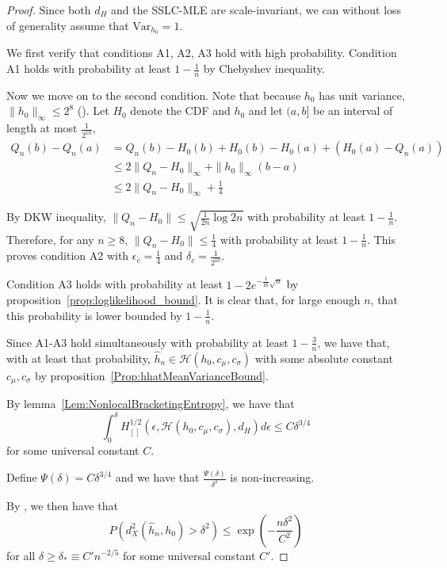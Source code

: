 \documentclass[12pt]{article}
\begin{document}
\begin{proof}

Since both $d_H$ and the SSLC-MLE are scale-invariant, we can without loss of generality assume that $\textrm{Var}_{h_0} = 1$.
  
We first verify that conditions A1, A2, A3 hold with high probability.
Condition A1 holds with probability at least $1 - \frac{1}{n}$ by Chebyshev inequality.

Now we move on to the second condition. Note that because $h_0$ has unit variance, $\| h_0 \|_\infty \leq 2^8$ (\cite[][Theorem~5.14]{lovasz2007geometry}). Let $H_0$ denote the CDF and $h_0$ and let $(a, b]$ be an interval of length at most $\frac{1}{2^{10}}$,
\begin{align*}
  Q_n(b) - Q_n(a) &= Q_n(b) - H_0(b) + H_0(b) - H_0(a) + (H_0(a) - Q_n(a)) \\
                  &\leq 2 \| Q_n - H_0 \|_\infty + \| h_0 \|_\infty (b - a) \\
                  & \leq 2 \| Q_n - H_0 \|_\infty + \frac{1}{4}
\end{align*}

By DKW inequality, $\| Q_n - H_0 \| \leq \sqrt{ \frac{1}{2n} \log 2 n}$ with probability at least $1 - \frac{1}{n}$. Therefore, for any $n \geq 8$, $\| Q_n - H_0 \| \leq \frac{1}{4}$ with probability at least $1 - \frac{1}{n}$. This proves condition A2 with $\epsilon_c = \frac{1}{4}$ and $\delta_c = \frac{1}{2^{10}}$.

Condition A3 holds with probability at least $1 - 2e^{-\frac{1}{16} \sqrt{n}}$ by proposition~\ref{prop:loglikelihood_bound}. It is clear that, for large enough $n$, that this probability is lower bounded by $1 - \frac{1}{n}$.

Since A1-A3 hold simultaneously with probability at least $1 - \frac{3}{n}$, we have that, with at least that probability, 
$\hat{h}_n \in \mathcal{H}(h_0, c_\mu, c_{\sigma})$ with some absolute constant $c_\mu, c_\sigma$ by proposition~\ref{Prop:hhatMeanVarianceBound}.

By lemma~\ref{Lem:NonlocalBracketingEntropy}, we have that
\[
  \int_0^\delta
  H^{1/2}_{[]}(\epsilon, \mathcal{H}(h_0, c_\mu, c_\sigma), d_H) d\epsilon \leq C \delta^{3/4}
\]
for some universal constant $C$.

Define $\Psi(\delta) = C \delta^{3/4}$ and we have that $\frac{\Psi(\delta)}{\delta^2}$ is non-increasing.

By \cite[][Theorem 10]{kim2016adaptation}, we then have that
\[
  P( d_X^2( \hat{h}_n, h_0) >  \delta^2 ) \leq
  \exp\left( - \frac{n \delta^2}{C^2} \right)
\]
for all $\delta \geq \delta_* \equiv C' n^{-2/5}$ for some universal constant $C'$.


\end{proof}
\end{document}

